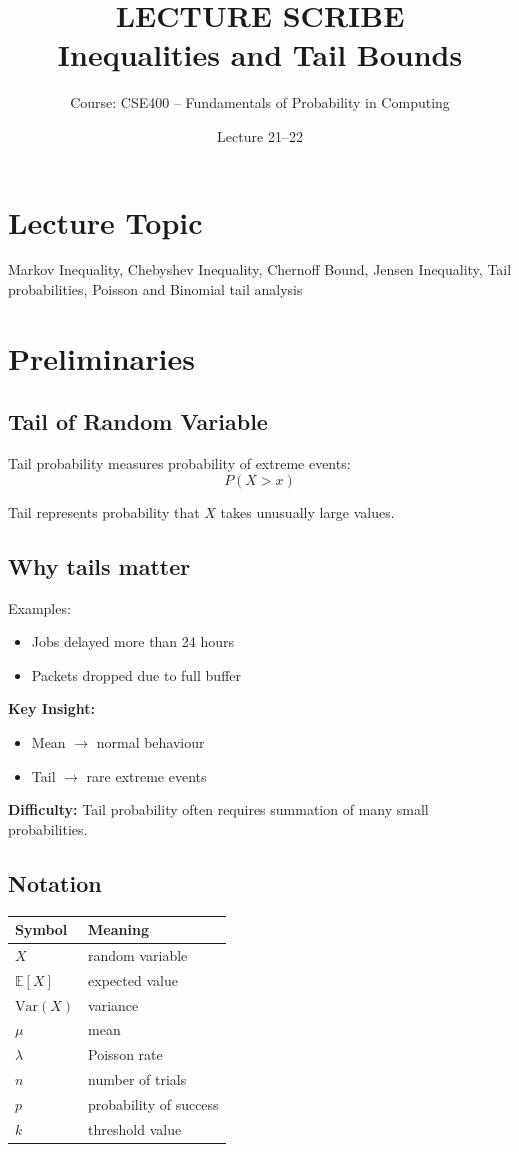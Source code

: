 \documentclass[12pt]{article}
\title{LECTURE SCRIBE\\
\large Inequalities and Tail Bounds}
\author{Course: CSE400 – Fundamentals of Probability in Computing}
\date{Lecture 21--22}
\begin{document}
\maketitle

\section*{Lecture Topic}
Markov Inequality, Chebyshev Inequality, Chernoff Bound, Jensen Inequality, Tail probabilities, Poisson and Binomial tail analysis

\section{Preliminaries}

\subsection{Tail of Random Variable}
Tail probability measures probability of extreme events:
\[
P(X > x)
\]

Tail represents probability that $X$ takes unusually large values.

\subsection{Why tails matter}
Examples:
\begin{itemize}
\item Jobs delayed more than 24 hours
\item Packets dropped due to full buffer
\end{itemize}

\textbf{Key Insight:}
\begin{itemize}
\item Mean $\rightarrow$ normal behaviour
\item Tail $\rightarrow$ rare extreme events
\end{itemize}

\textbf{Difficulty:} Tail probability often requires summation of many small probabilities.

\subsection{Notation}

\begin{center}
\begin{tabular}{ll}
\toprule
Symbol & Meaning \\
\midrule
$X$ & random variable \\
$\mathbb{E}[X]$ & expected value \\
$\mathrm{Var}(X)$ & variance \\
$\mu$ & mean \\
$\lambda$ & Poisson rate \\
$n$ & number of trials \\
$p$ & probability of success \\
$k$ & threshold value \\
\bottomrule
\end{tabular}
\end{center}
\end{document}
